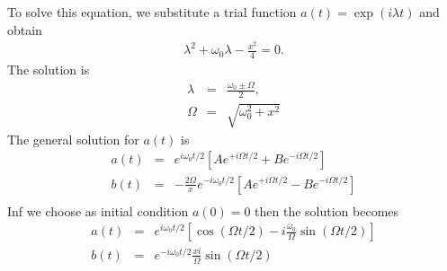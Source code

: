 \documentclass[a4paper]{article}
\def\braceb#1{\left[ #1 \right]}
\begin{document}
To solve this equation, we substitute a trial function $a(t)=\exp(i\lambda t)$ and obtain
\begin{eqnarray}
  \lambda^2 + \omega_0\lambda - \frac{x^2}{4} = 0.
\end{eqnarray}
The solution is
\begin{eqnarray}
  \lambda &=& \frac{\omega_0 \pm \Omega }{2}, \\
  \Omega  &=& \sqrt{\omega_0^2 + x^2}  
\end{eqnarray}
The general solution for $a(t)$ is
\begin{eqnarray}
  a(t) &=& e^{i\omega_0t/2} \braceb{ Ae^{+i\Omega t/2} +Be^{-i\Omega t/2} } \\
  b(t) &=& -\frac{2\Omega}{x} e^{-i\omega_0t/2}  \braceb{ Ae^{+i\Omega t/2} -Be^{-i\Omega t/2} } \\
\end{eqnarray}
Inf we choose as initial condition $a(0) = 0$ then the solution becomes
\begin{eqnarray}
  a(t) &=& e^{i\omega_0t/2} \braceb{\cos(\Omega t/2) - i\frac{\omega_0}{\Omega}\sin(\Omega t/2)} \\
  b(t) &=& e^{-i\omega_0t/2} \frac{xi}{\Omega} \sin(\Omega t/2)
\end{eqnarray}
\end{document}
